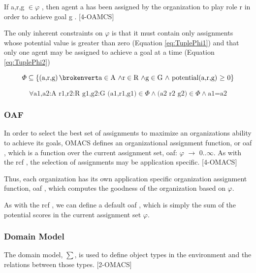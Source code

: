 If \textlangle a,r,g \textrangle $\in \varphi$ , then agent a has been assigned by the organization to play role r in order to achieve goal g . [4-OAMCS]

The only inherent constraints on $\varphi$ is that it must contain only assignments whose potential value is greater than zero (Equation \ref{eq:TuplePhi1}) and that only one agent may be assigned to achieve a goal at a time (Equation \ref{eq:TuplePhi2})		


\begin{equation}
\varPhi\subseteq\left\{ \left(\textrm{a,r,g}\right)\brokenvert\textrm{a}\in\textrm{A \ensuremath{\land}}\textrm{r}\in\textrm{R \ensuremath{\land\textrm{g}\in\textrm{G \ensuremath{\land} \textrm{potential(a,r,g) \ensuremath{\ge} 0}}}}\right\} 
\label{eq:TuplePhi1}
\end{equation}

\begin{equation}
\forall\textrm{a1,a2:A r1,r2:R g1,g2:G (a1,r1,g1)}\in\varPhi\land\textrm{(a2 r2 g2)}\in\varPhi\land\textrm{a1=a2}\label{eq:TuplePhi2}
\end{equation}

 		
 

\subsubsection{ OAF }
	In order to select the best set of assignments to maximize an organizations ability to achieve its goals, OMACS defines an organizational assignment function, or oaf , which is a function over the current assignment set, oaf: $\varphi$ $\rightarrow$ 0..$\infty$. As with the rcf , the selection of assignments may be application specific. [4-OMACS]
	
Thus, each organization has its own application specific organization assignment function, oaf , which computes the goodness of the organization based on $\varphi$. 
	
As with the rcf , we can define a default  oaf , which is simply the sum of the potential scores in the current assignment set $\varphi$.
                     
 
\subsubsection{ Domain Model } 

The domain model, $\sum$, is used to define object types in the environment 
and the relations between those types. [2-OMACS]


